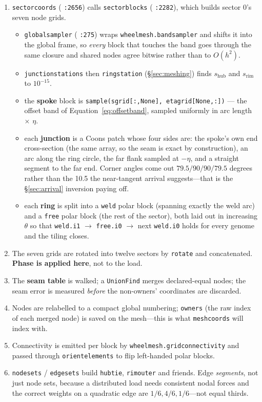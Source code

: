 \documentclass[11pt,a4paper]{article}
\DeclareRobustCommand{\code}[1]{%
  \texttt{\small\def\_{\textunderscore\discretionary{}{}{}}#1}}
\begin{document}
\begin{enumerate}
\item \code{\_sector\_coords} (\code{:2656}) calls \code{sector\_blocks} (\code{:2282}),
  which builds sector 0's seven node grids.
  \begin{itemize}
  \item \code{global\_sampler} (\code{:275}) wraps \code{wheel\_mesh.band\_sampler} and
    shifts it into the global frame, so \emph{every} block that touches the band goes
    through the same closure and shared nodes agree bitwise rather than to $O(h^2)$.
  \item \code{junction\_stations} then \code{ring\_station} (\S\ref{sec:meshing}) finds
    $s_{\text{hub}}$ and $s_{\text{rim}}$ to $10^{-15}$.
  \item the \textbf{spoke} block is \code{sample(s\_grid[:,None], eta\_grid[None,:])}
    --- the offset band of Equation~\eqref{eq:offsetband}, sampled uniformly in arc
    length $\times$ $\eta$.
  \item each \textbf{junction} is a Coons patch whose four sides are: the spoke's own
    end cross-section (the same array, so the seam is exact by construction), an arc
    along the ring circle, the far flank sampled at $-\eta$, and a straight segment to
    the far end. Corner angles come out $79.5 / 90 / 90 / 79.5$ degrees rather than the
    10.5 the near-tangent arrival suggests---that is the \S\ref{sec:arrival} inversion
    paying off.
  \item each \textbf{ring} is split into a \code{\_weld} polar block (spanning exactly
    the weld arc) and a \code{\_free} polar block (the rest of the sector), both laid
    out in increasing $\theta$ so that
    \code{weld.i1} $\to$ \code{free.i0} $\to$ next \code{weld.i0} holds for every genome
    and the tiling closes.
  \end{itemize}
\item The seven grids are rotated into twelve sectors by \code{\_rotate} and
  concatenated. \textbf{Phase is applied here}, not to the load.
\item The \textbf{seam table} is walked; a \code{\_UnionFind} merges declared-equal
  nodes; the seam error is measured \emph{before} the non-owners' coordinates are
  discarded.
\item Nodes are relabelled to a compact global numbering; \code{owners} (the raw index
  of each merged node) is saved on the mesh---this is what \code{mesh\_coords} will
  index with.
\item Connectivity is emitted per block by \code{wheel\_mesh.grid\_connectivity} and
  passed through \code{\_orient\_elements} to flip left-handed polar blocks.
\item \code{\_node\_sets} / \code{\_edge\_sets} build \code{hub\_tie},
  \code{rim\_outer} and friends. Edge \emph{segments}, not just node sets, because a
  distributed load needs consistent nodal forces and the correct weights on a quadratic
  edge are $1/6, 4/6, 1/6$---not equal thirds.
\end{enumerate}
\end{document}
